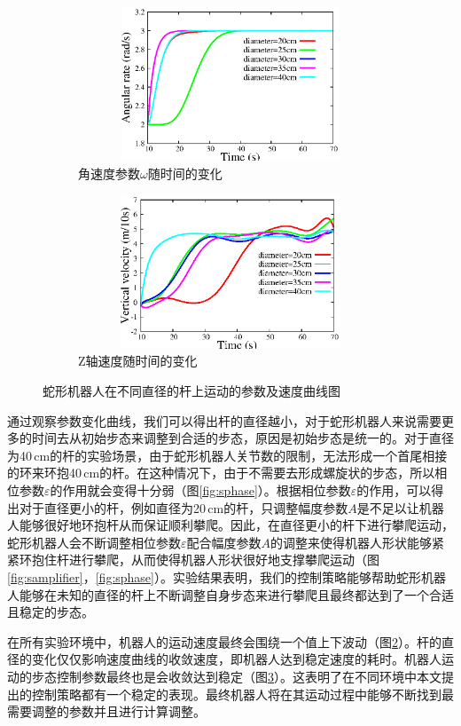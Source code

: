 \begin{figure}[htbp]
\begin{subfigure}{0.45\textwidth}{
			\centering
			\includegraphics[width=1\textwidth,height=130pt]{figure/chap05/sarate.eps}	
			\caption{角速度参数$\omega$随时间的变化}
			\label{fig:sarate}
		}
	\end{subfigure}
	\begin{subfigure}{0.45\textwidth}{
			\centering
			\includegraphics[width=1\textwidth,height=130pt]{figure/chap05/svel.eps}
			\caption{Z轴速度随时间的变化}
			\label{fig:svelocity}
		}
	\end{subfigure}
	\caption{蛇形机器人在不同直径的杆上运动的参数及速度曲线图}
	\label{fig:scurve}
\end{figure}

通过观察参数变化曲线，我们可以得出杆的直径越小，对于蛇形机器人来说需要更多的时间去从初始步态来调整到合适的步态，原因是初始步态是统一的。对于直径为40\,cm的杆的实验场景，由于蛇形机器人关节数的限制，无法形成一个首尾相接的环来环抱40\,cm的杆。在这种情况下，由于不需要去形成螺旋状的步态，所以相位参数$\varepsilon$的作用就会变得十分弱（图\ref{fig:sphase}）。根据相位参数$\varepsilon$的作用，可以得出对于直径更小的杆，例如直径为20\,cm的杆，只调整幅度参数$A$是不足以让机器人能够很好地环抱杆从而保证顺利攀爬。因此，在直径更小的杆下进行攀爬运动，蛇形机器人会不断调整相位参数$\varepsilon$配合幅度参数$A$的调整来使得机器人形状能够紧紧环抱住杆进行攀爬，从而使得机器人形状很好地支撑攀爬运动（图\ref{fig:samplifier}，\ref{fig:sphase}）。实验结果表明，我们的控制策略能够帮助蛇形机器人能够在未知的直径的杆上不断调整自身步态来进行攀爬且最终都达到了一个合适且稳定的步态。

在所有实验环境中，机器人的运动速度最终会围绕一个值上下波动（图\ref{fig:svelocity}）。杆的直径的变化仅仅影响速度曲线的收敛速度，即机器人达到稳定速度的耗时。机器人运动的步态控制参数最终也是会收敛达到稳定（图\ref{fig:scurve}）。这表明了在不同环境中本文提出的控制策略都有一个稳定的表现。最终机器人将在其运动过程中能够不断找到最需要调整的参数并且进行计算调整。



